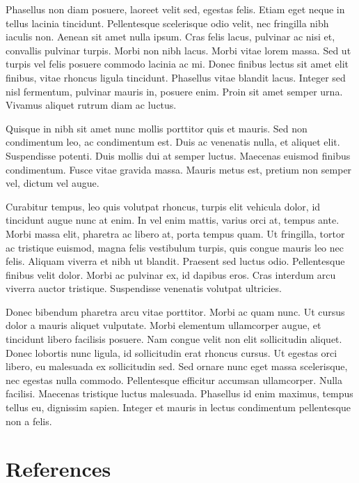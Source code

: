 \documentclass[
  letterpaper,
  oneside]{scrbook}
\begin{document}
Phasellus non diam posuere, laoreet velit sed, egestas felis. Etiam eget
neque in tellus lacinia tincidunt. Pellentesque scelerisque odio velit,
nec fringilla nibh iaculis non. Aenean sit amet nulla ipsum. Cras felis
lacus, pulvinar ac nisi et, convallis pulvinar turpis. Morbi non nibh
lacus. Morbi vitae lorem massa. Sed ut turpis vel felis posuere commodo
lacinia ac mi. Donec finibus lectus sit amet elit finibus, vitae rhoncus
ligula tincidunt. Phasellus vitae blandit lacus. Integer sed nisl
fermentum, pulvinar mauris in, posuere enim. Proin sit amet semper urna.
Vivamus aliquet rutrum diam ac luctus.

Quisque in nibh sit amet nunc mollis porttitor quis et mauris. Sed non
condimentum leo, ac condimentum est. Duis ac venenatis nulla, et aliquet
elit. Suspendisse potenti. Duis mollis dui at semper luctus. Maecenas
euismod finibus condimentum. Fusce vitae gravida massa. Mauris metus
est, pretium non semper vel, dictum vel augue.

Curabitur tempus, leo quis volutpat rhoncus, turpis elit vehicula dolor,
id tincidunt augue nunc at enim. In vel enim mattis, varius orci at,
tempus ante. Morbi massa elit, pharetra ac libero at, porta tempus quam.
Ut fringilla, tortor ac tristique euismod, magna felis vestibulum
turpis, quis congue mauris leo nec felis. Aliquam viverra et nibh ut
blandit. Praesent sed luctus odio. Pellentesque finibus velit dolor.
Morbi ac pulvinar ex, id dapibus eros. Cras interdum arcu viverra auctor
tristique. Suspendisse venenatis volutpat ultricies.

Donec bibendum pharetra arcu vitae porttitor. Morbi ac quam nunc. Ut
cursus dolor a mauris aliquet vulputate. Morbi elementum ullamcorper
augue, et tincidunt libero facilisis posuere. Nam congue velit non elit
sollicitudin aliquet. Donec lobortis nunc ligula, id sollicitudin erat
rhoncus cursus. Ut egestas orci libero, eu malesuada ex sollicitudin
sed. Sed ornare nunc eget massa scelerisque, nec egestas nulla commodo.
Pellentesque efficitur accumsan ullamcorper. Nulla facilisi. Maecenas
tristique luctus malesuada. Phasellus id enim maximus, tempus tellus eu,
dignissim sapien. Integer et mauris in lectus condimentum pellentesque
non a felis.


\hypertarget{references}{%
\chapter*{References}\label{references}}
\end{document}
